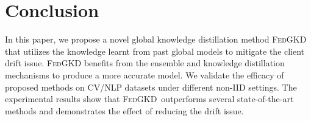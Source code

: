 \documentclass{article} %
\newcommand{\system}{\textsc{FedGKD}\xspace}
\begin{document}
\section{Conclusion}
In this paper, we propose a novel global knowledge distillation method \system that utilizes the knowledge learnt from past global models to mitigate the client drift issue. \system benefits from the ensemble and knowledge distillation mechanisms to produce a more accurate model.
We validate the efficacy of proposed methods on CV/NLP datasets under different non-IID settings. The experimental results show that \system\ outperforms several state-of-the-art methods and demonstrates the effect of reducing the drift issue.








\newpage
\end{document}
